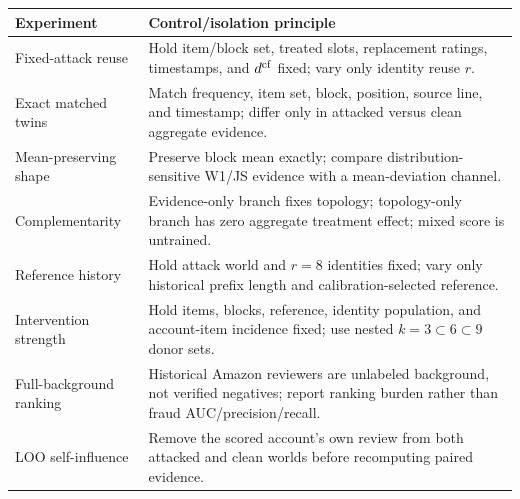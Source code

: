 \begin{tabular}{ll}
\toprule
Experiment & Control/isolation principle \\
\midrule
Fixed-attack reuse & Hold item/block set, treated slots, replacement ratings, timestamps, and $d^{\rm cf}$ fixed; vary only identity reuse $r$. \\
Exact matched twins & Match frequency, item set, block, position, source line, and timestamp; differ only in attacked versus clean aggregate evidence. \\
Mean-preserving shape & Preserve block mean exactly; compare distribution-sensitive W1/JS evidence with a mean-deviation channel. \\
Complementarity & Evidence-only branch fixes topology; topology-only branch has zero aggregate treatment effect; mixed score is untrained. \\
Reference history & Hold attack world and $r=8$ identities fixed; vary only historical prefix length and calibration-selected reference. \\
Intervention strength & Hold items, blocks, reference, identity population, and account-item incidence fixed; use nested $k=3\subset6\subset9$ donor sets. \\
Full-background ranking & Historical Amazon reviewers are unlabeled background, not verified negatives; report ranking burden rather than fraud AUC/precision/recall. \\
LOO self-influence & Remove the scored account's own review from both attacked and clean worlds before recomputing paired evidence. \\
\bottomrule
\end{tabular}
